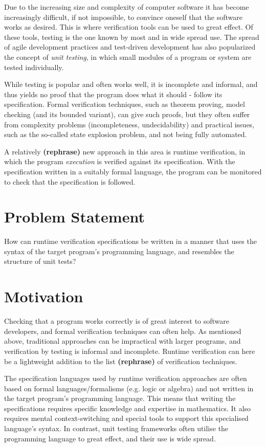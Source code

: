 \documentclass[a4paper,11pt]{kth-mag}
\newcommand{\rephrase}{\textbf{(rephrase)} }
\begin{document}
Due to the increasing size and complexity of computer software it has become increasingly difficult,
if not impossible, to convince oneself that the software works as desired. This is where verification tools can be used to great effect. Of these tools, testing is the one known by most and in wide spread use.
The spread of agile development practices and test-driven development has also popularized the
concept of \textit{unit testing}, in which small modules of a program or system are tested individually.

While testing is popular and often works well, it is incomplete and informal, and thus yields
no proof that the program does what it should - follow its specification. Formal verification
techniques, such as theorem proving, model checking (and its bounded variant), can give such
proofs, but they often suffer from complexity problems (incompleteness, undecidability) and
practical issues, such as the so-called state explosion problem, and not being fully automated.

A relatively \rephrase new approach in this area is runtime verification, in which the
program \textit{execution} is verified against its specification. With the specification written
in a suitably formal language, the program can be monitored to check that the specification is
followed.


\section{Problem Statement}

How can runtime verification specifications be written in a manner that uses
the syntax of the target program’s programming language, and resembles
the structure of unit tests?

\section{Motivation}

Checking that a program works correctly is of great interest to software developers, and
formal verification techniques can often help. As mentioned above, traditional approaches
can be impractical with larger programs, and verification by testing is
informal and incomplete. Runtime verification can here be a lightweight addition to the list \rephrase of verification techniques.

The specification languages used by runtime verification approaches are often based
on formal languages/formalisms (e.g. logic or algebra) and not written in the
target program's programming language.  This means that writing the specifications
requires specific knowledge and expertise in mathematics. 
It also requires mental context-switching and special tools
to support this specialised language's syntax. In contrast, unit testing frameworks often
utilise the programming language to great effect, and their use is wide spread.
\end{document}
